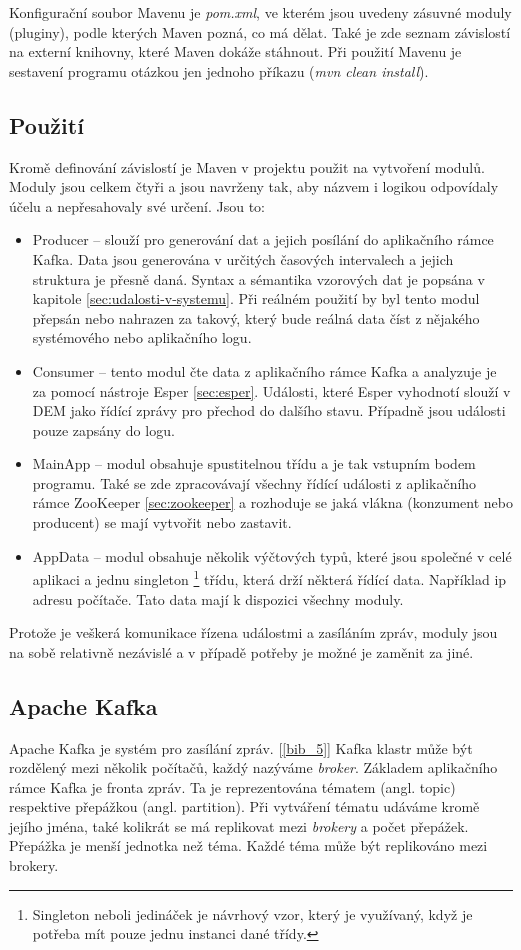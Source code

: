\documentclass[
  digital, %
  table,   %
  nolof,     %
  nolot,     %
  oneside, %
  nocover,
  monochrome,
  12pt
]{fithesis3}
\begin{document}
Konfigurační soubor Mavenu je \textit{pom.xml}, ve kterém jsou uvedeny zásuvné moduly (pluginy), podle kterých Maven pozná, co má dělat. Také je zde seznam závislostí na externí knihovny, které Maven dokáže stáhnout. Při použití Mavenu je sestavení programu otázkou jen jednoho příkazu (\textit{mvn clean install}).

\subsection*{Použití}
\label{sec:maven-usage}
Kromě definování závislostí je Maven v projektu použit na vytvoření modulů. Moduly jsou celkem čtyři a jsou navrženy tak, aby názvem i logikou odpovídaly účelu a nepřesahovaly své určení. Jsou to:
\begin{itemize}
  \item Producer -- slouží pro generování dat a jejich posílání do aplikačního rámce Kafka. Data jsou generována v určitých časových intervalech a jejich struktura je přesně daná. Syntax a sémantika vzorových dat je popsána v kapitole \ref{sec:udalosti-v-systemu}. Při reálném použití by byl tento modul přepsán nebo nahrazen za takový, který bude reálná data číst z nějakého systémového nebo aplikačního logu.
  \item Consumer -- tento modul čte data z aplikačního rámce Kafka a analyzuje je za pomocí nástroje Esper \ref{sec:esper}. Události, které Esper vyhodnotí slouží v DEM jako řídící zprávy pro přechod do dalšího stavu. Případně jsou události pouze zapsány do logu.
  \item MainApp -- modul obsahuje spustitelnou třídu a je tak vstupním bodem programu. Také se zde zpracovávají všechny řídící události z aplikačního rámce ZooKeeper \ref{sec:zookeeper} a rozhoduje se jaká vlákna (konzument nebo producent) se mají vytvořit nebo zastavit.
  \item AppData -- modul obsahuje několik výčtových typů, které jsou společné v celé aplikaci a jednu singleton \footnote{Singleton neboli jedináček je návrhový vzor, který je využívaný, když je potřeba mít pouze jednu instanci dané třídy.} třídu, která drží některá řídící data. Například ip adresu počítače. Tato data mají k dispozici všechny moduly.
\end{itemize}
Protože je veškerá komunikace řízena událostmi a zasíláním zpráv, moduly jsou na sobě relativně nezávislé a v případě potřeby je možné je zaměnit za jiné. 

\subsection{Apache Kafka}
\label{sec:kafka}
Apache Kafka je systém pro zasílání zpráv. [\ref{bib_5}] Kafka klastr může být rozdělený mezi několik počítačů, každý nazýváme \textit{broker}. Základem aplikačního rámce Kafka je fronta zpráv. Ta je reprezentována tématem (angl. topic) respektive přepážkou (angl. partition). Při vytváření tématu udáváme kromě jejího jména, také kolikrát se má replikovat mezi \textit{brokery} a počet přepážek. Přepážka je menší jednotka než téma. Každé téma může být replikováno mezi brokery.
\end{document}
